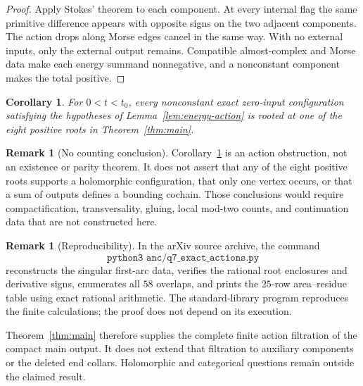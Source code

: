 \documentclass[11pt,reqno]{amsart}
\theoremstyle{plain}
\newtheorem{corollary}[theorem]{Corollary}
\theoremstyle{definition}
\newtheorem{remark}[theorem]{Remark}
\begin{document}
\begin{proof}
Apply Stokes' theorem to each component.  At every internal flag the same primitive difference
appears with opposite signs on the two adjacent components.  The action drops along Morse edges
cancel in the same way.  With no external inputs, only the external output remains.  Compatible
almost-complex and Morse data make each energy summand nonnegative, and a nonconstant component
makes the total positive.
\end{proof}

\begin{corollary}\label{cor:eight-candidates}
For $0<t<t_0$, every nonconstant exact zero-input configuration satisfying the hypotheses of
Lemma~\ref{lem:energy-action} is rooted at one of the eight positive roots in
Theorem~\ref{thm:main}.
\end{corollary}

\begin{remark}[No counting conclusion]\label{rem:no-count}
Corollary~\ref{cor:eight-candidates} is an action obstruction, not an existence or parity theorem.
It does not assert that any of the eight positive roots supports a holomorphic configuration, that
only one vertex occurs, or that a sum of outputs defines a bounding cochain.  Those conclusions
would require compactification, transversality, gluing, local mod-two counts, and continuation
data that are not constructed here.
\end{remark}

\begin{remark}[Reproducibility]\label{rem:reproducibility}
In the arXiv source archive, the command
\[
 \texttt{python3 anc/q7\_exact\_actions.py}
\]
reconstructs the singular first-arc data, verifies the rational root enclosures and derivative
signs, enumerates all $58$ overlaps, and prints the $25$-row area--residue table using exact
rational arithmetic.  The standard-library program reproduces the finite calculations; the proof
does not depend on its execution.
\end{remark}

Theorem~\ref{thm:main} therefore supplies the complete finite action filtration of the compact
main output.  It does not extend that filtration to auxiliary components or the deleted end
collars.  Holomorphic and categorical questions remain outside the claimed result.
\end{document}
